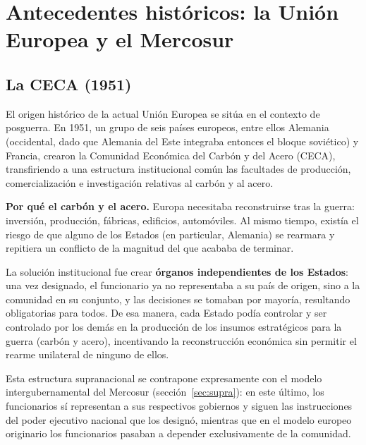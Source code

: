 \documentclass[12pt,oneside]{book}
\begin{document}
\chapter{Antecedentes históricos: la Unión Europea y el Mercosur}

\section{La CECA (1951)}

El origen histórico de la actual Unión Europea se sitúa en el contexto de posguerra. En 1951, un grupo de seis países europeos, entre ellos Alemania (occidental, dado que Alemania del Este integraba entonces el bloque soviético) y Francia, crearon la Comunidad Económica del Carbón y del Acero (CECA), transfiriendo a una estructura institucional común las facultades de producción, comercialización e investigación relativas al carbón y al acero.

\textbf{Por qué el carbón y el acero.} Europa necesitaba reconstruirse tras la guerra: inversión, producción, fábricas, edificios, automóviles. Al mismo tiempo, existía el riesgo de que alguno de los Estados (en particular, Alemania) se rearmara y repitiera un conflicto de la magnitud del que acababa de terminar.

La solución institucional fue crear \textbf{órganos independientes de los Estados}: una vez designado, el funcionario ya no representaba a su país de origen, sino a la comunidad en su conjunto, y las decisiones se tomaban por mayoría, resultando obligatorias para todos. De esa manera, cada Estado podía controlar y ser controlado por los demás en la producción de los insumos estratégicos para la guerra (carbón y acero), incentivando la reconstrucción económica sin permitir el rearme unilateral de ninguno de ellos.

Esta estructura supranacional se contrapone expresamente con el modelo intergubernamental del Mercosur (sección~\ref{sec:supra}): en este último, los funcionarios sí representan a sus respectivos gobiernos y siguen las instrucciones del poder ejecutivo nacional que los designó, mientras que en el modelo europeo originario los funcionarios pasaban a depender exclusivamente de la comunidad.
\end{document}
